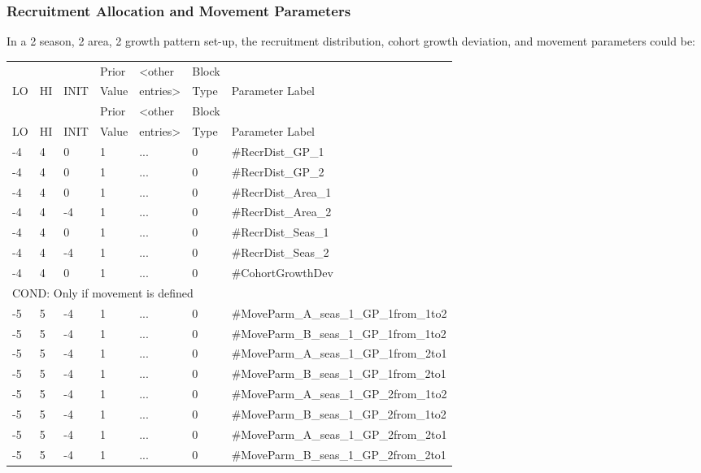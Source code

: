 \subsubsection{Recruitment Allocation and Movement Parameters}
In a 2 season, 2 area, 2 growth pattern set-up, the recruitment distribution, cohort growth deviation, and movement parameters could be:

\begin{center}
	\begin{longtable}{ p{0.7cm} p{0.7cm} p{0.7cm}  p{1cm}  p{1.4cm}  p{1cm}  p{8cm}  }
		\hline
		&  &  & Prior &  <other & Block &  \\
		LO & HI & INIT & Value &  entries> & Type & Parameter Label \\
		\hline
		\endfirsthead

		\hline
		&  &  & Prior &  <other & Block &  \\
		LO & HI & INIT & Value &  entries> & Type & Parameter Label \\
		\hline
		\endhead

		\endfoot

		\endlastfoot

		-4   & 4    & 0    & 1    & ... & 0 & \#RecrDist\_GP\_1\\
	    -4   & 4    & 0    & 1    & ... & 0 &  \#RecrDist\_GP\_2\\
		-4   & 4    & 0    & 1    & ... & 0 &  \#RecrDist\_Area\_1 \\
		-4   & 4    & -4   & 1    & ... & 0 &  \#RecrDist\_Area\_2 \\
		-4   & 4    & 0    & 1    & ... & 0 &  \#RecrDist\_Seas\_1 \\
		-4   & 4    & -4   & 1    & ... & 0 &  \#RecrDist\_Seas\_2 \\
		-4   & 4    & 0    & 1    & ... & 0 & \#CohortGrowthDev \\
		\multicolumn{7}{l}{COND: Only if movement is defined} \\
		-5   & 5    & -4   & 1    & ... & 0 & \#MoveParm\_A\_seas\_1\_GP\_1from\_1to2 \\
		-5   & 5    & -4   & 1    & ... & 0 & \#MoveParm\_B\_seas\_1\_GP\_1from\_1to2 \\
		-5   & 5    & -4   & 1    & ... & 0 & \#MoveParm\_A\_seas\_1\_GP\_1from\_2to1 \\
		-5   & 5    & -4   & 1    & ... & 0 & \#MoveParm\_B\_seas\_1\_GP\_1from\_2to1 \\
		-5   & 5    & -4   & 1    & ... & 0 & \#MoveParm\_A\_seas\_1\_GP\_2from\_1to2 \\
		-5   & 5    & -4   & 1    & ... & 0 & \#MoveParm\_B\_seas\_1\_GP\_2from\_1to2 \\
		-5   & 5    & -4   & 1    & ... & 0 & \#MoveParm\_A\_seas\_1\_GP\_2from\_2to1 \\
		-5   & 5    & -4   & 1    & ... & 0 & \#MoveParm\_B\_seas\_1\_GP\_2from\_2to1 \\
		\hline
	\end{longtable}
\end{center}

